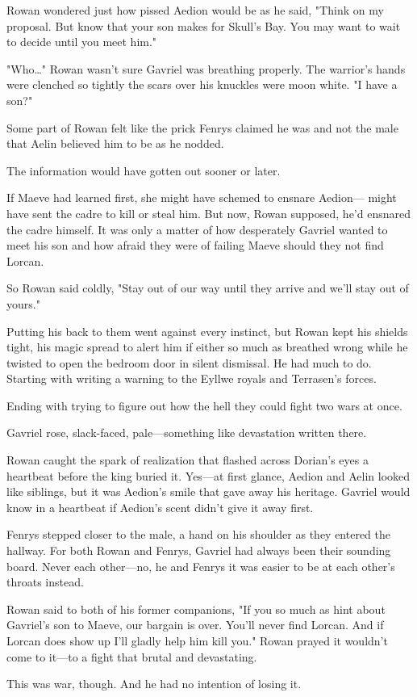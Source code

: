 Rowan wondered just how pissed Aedion would be as he said, "Think on my proposal. But know that your son makes for Skull's Bay. You may want to wait to decide until you meet him."

"Who\ldots" Rowan wasn't sure Gavriel was breathing properly. The warrior's hands were clenched so tightly the scars over his knuckles were moon white. "I have a son?"

Some part of Rowan felt like the prick Fenrys claimed he was and not the male that Aelin believed him to be as he nodded.

The information would have gotten out sooner or later.

If Maeve had learned first, she might have schemed to ensnare Aedion--- might have sent the cadre to kill or steal him. But now, Rowan supposed, he'd ensnared the cadre himself. It was only a matter of how desperately Gavriel wanted to meet his son  and how afraid they were of failing Maeve should they not find Lorcan.

So Rowan said coldly, "Stay out of our way until they arrive and we'll stay out of yours."

Putting his back to them went against every instinct, but Rowan kept his shields tight, his magic spread to alert him if either so much as breathed wrong while he twisted to open the bedroom door in silent dismissal. He had much to do. Starting with writing a warning to the Eyllwe royals and Terrasen's forces.

Ending with trying to figure out how the hell they could fight two wars at once.

Gavriel rose, slack-faced, pale---something like devastation written there.

Rowan caught the spark of realization that flashed across Dorian's eyes a heartbeat before the king buried it. Yes---at first glance, Aedion and Aelin looked like siblings, but it was Aedion's smile that gave away his heritage. Gavriel would know in a heartbeat  if Aedion's scent didn't give it away first.

Fenrys stepped closer to the male, a hand on his shoulder as they entered the hallway. For both Rowan and Fenrys, Gavriel had always been their sounding board. Never each other---no, he and Fenrys  it was easier to be at each other's throats instead.

Rowan said to both of his former companions, "If you so much as hint about Gavriel's son to Maeve, our bargain is over. You'll never find Lorcan. And if Lorcan does show up  I'll gladly help him kill you." Rowan prayed it wouldn't come to it---to a fight that brutal and devastating.

This was war, though. And he had no intention of losing it.
